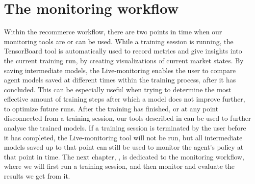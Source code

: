 
\section{The monitoring workflow}

Within the recommerce workflow, there are two points in time when our monitoring tools are or can be used. While a training session is running, the TensorBoard tool is automatically used to record metrics and give insights into the current training run, by creating visualizations of current market states. By saving intermediate models, the Live-monitoring enables the user to compare agent models saved at different times within the training process, after it has concluded. This can be especially useful when trying to determine the most effective amount of training steps after which a model does not improve further, to optimize future runs. After the training has finished, or at any point disconnected from a training session, our tools described in  can be used to further analyse the trained models. If a training session is terminated by the user before it has completed, the Live-monitoring tool will not be run, but all intermediate models saved up to that point can still be used to monitor the agent's policy at that point in time. The next chapter, , is dedicated to the monitoring workflow, where we will first run a training session, and then monitor and evaluate the results we get from it.


